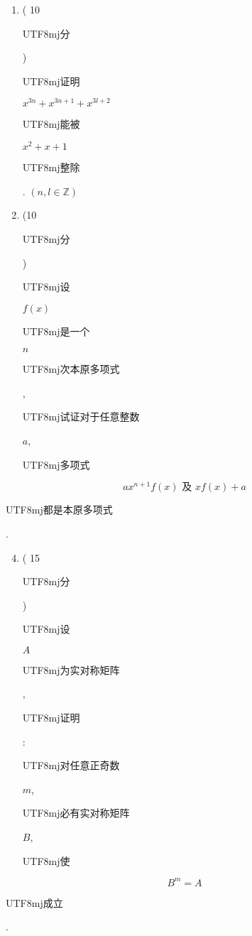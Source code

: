 \documentclass[10pt]{article}
\begin{document}
\begin{enumerate}
  \item ( 10 \begin{CJK}{UTF8}{mj}分\end{CJK}) \begin{CJK}{UTF8}{mj}证明\end{CJK} $x^{3 n}+x^{3 n+1}+x^{3 l+2}$ \begin{CJK}{UTF8}{mj}能被\end{CJK} $x^{2}+x+1$ \begin{CJK}{UTF8}{mj}整除\end{CJK}. $(n, l \in \mathbb{Z})$

  \item (10 \begin{CJK}{UTF8}{mj}分\end{CJK}) \begin{CJK}{UTF8}{mj}设\end{CJK} $f(x)$ \begin{CJK}{UTF8}{mj}是一个\end{CJK} $n$ \begin{CJK}{UTF8}{mj}次本原多项式\end{CJK}, \begin{CJK}{UTF8}{mj}试证对于任意整数\end{CJK} $a$, \begin{CJK}{UTF8}{mj}多项式\end{CJK}

\end{enumerate}
$$
a x^{n+1} f(x) \text { 及 } x f(x)+a
$$
\begin{CJK}{UTF8}{mj}都是本原多项式\end{CJK}.

\begin{enumerate}
  \setcounter{enumi}{3}
  \item ( 15 \begin{CJK}{UTF8}{mj}分\end{CJK}) \begin{CJK}{UTF8}{mj}设\end{CJK} $A$ \begin{CJK}{UTF8}{mj}为实对称矩阵\end{CJK}, \begin{CJK}{UTF8}{mj}证明\end{CJK}: \begin{CJK}{UTF8}{mj}对任意正奇数\end{CJK} $m$, \begin{CJK}{UTF8}{mj}必有实对称矩阵\end{CJK} $B$, \begin{CJK}{UTF8}{mj}使\end{CJK}
\end{enumerate}
$$
B^{m}=A
$$
\begin{CJK}{UTF8}{mj}成立\end{CJK}.
\end{document}
